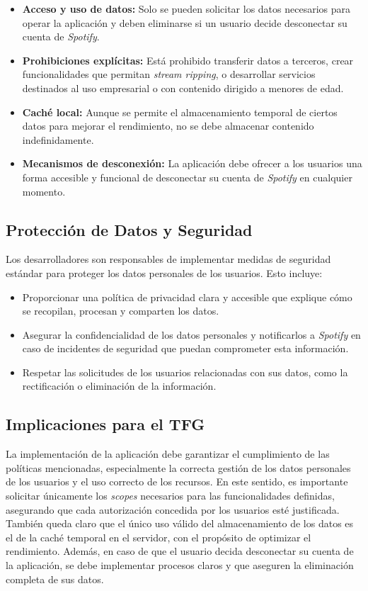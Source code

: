 \begin{itemize}
    \item \textbf{Acceso y uso de datos:} Solo se pueden solicitar los datos necesarios para operar la aplicación y deben eliminarse si un usuario decide desconectar su cuenta de \textit{Spotify}.
    \item \textbf{Prohibiciones explícitas:} Está prohibido transferir datos a terceros, crear funcionalidades que permitan \textit{stream ripping}, o desarrollar servicios destinados al uso empresarial o con contenido dirigido a menores de edad.
    \item \textbf{Caché local:} Aunque se permite el almacenamiento temporal de ciertos datos para mejorar el rendimiento, no se debe almacenar contenido indefinidamente.
    \item \textbf{Mecanismos de desconexión:} La aplicación debe ofrecer a los usuarios una forma accesible y funcional de desconectar su cuenta de \textit{Spotify} en cualquier momento.
\end{itemize}

\newpage

\subsection{Protección de Datos y Seguridad}

Los desarrolladores son responsables de implementar medidas de seguridad estándar para proteger los datos personales de los usuarios. Esto incluye:

\begin{itemize}
    \item Proporcionar una política de privacidad clara y accesible que explique cómo se recopilan, procesan y comparten los datos.
    \item Asegurar la confidencialidad de los datos personales y notificarlos a \textit{Spotify} en caso de incidentes de seguridad que puedan comprometer esta información.
    \item Respetar las solicitudes de los usuarios relacionadas con sus datos, como la rectificación o eliminación de la información.
\end{itemize}

\subsection{Implicaciones para el TFG}

La implementación de la aplicación debe garantizar el cumplimiento de las políticas mencionadas, especialmente la correcta gestión de los datos personales de los usuarios y el uso correcto de los recursos. En este sentido, es importante solicitar únicamente los \textit{scopes} necesarios para las funcionalidades definidas, asegurando que cada autorización concedida por los usuarios esté justificada. También queda claro que el único uso válido del almacenamiento de los datos es el de la caché temporal en el servidor, con el propósito de optimizar el rendimiento. Además, en caso de que el usuario decida desconectar su cuenta de la aplicación, se debe implementar procesos claros y que aseguren la eliminación completa de sus datos.

